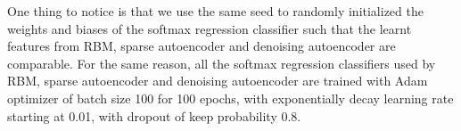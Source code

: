 One thing to notice is that we use the same seed to randomly initialized the weights and biases
of the softmax regression classifier such that the learnt features from RBM, sparse autoencoder and
denoising autoencoder are comparable.
For the same reason, all the softmax regression classifiers used by RBM, sparse autoencoder and
denoising autoencoder are trained with Adam optimizer of batch size 100 for 100 epochs,
with exponentially decay learning rate starting at 0.01, with dropout of keep probability 0.8.
